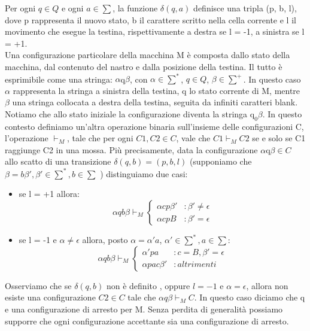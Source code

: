 Per ogni $q \in Q$ e ogni $a \in \sum$, la funzione $\delta(q, a)$ definisce una tripla (p, b, l), dove p rappresenta il nuovo stato, b il carattere scritto nella cella corrente e l il movimento che esegue la testina, rispettivamente a destra se l = -1, a sinistra se l = +1.\\
Una configurazione particolare della macchina M è composta dallo stato della macchina, dal contenuto del nastro e dalla posizione della testina. Il tutto è esprimibile come una stringa: $\alpha$q$\beta$, con $\alpha \in \sum^*$, $q \in Q$, $\beta \in \sum^+$. In questo caso $\alpha$ rappresenta la stringa a sinistra della testina, q lo stato corrente di M, mentre $\beta$ una stringa collocata a destra della testina, seguita da infiniti caratteri blank. Notiamo che allo stato iniziale la configurazione diventa la stringa $\mathrm{q}_{0} \beta$. In questo contesto definiamo un'altra operazione binaria sull'insieme delle configurazioni C, l'operazione $\vdash_{M}$, tale che per ogni $C1, C2 \in C$, vale che $C1 \vdash_{M} C2$ se e solo se C1 raggiunge C2 in una mossa. Più precisamente, data la configurazione $\alpha$q$\beta \in C$ allo scatto di una transizione $\delta(q, b) = (p, b, l)$ (supponiamo che $\beta = b\beta', \beta' \in \sum^*, b \in \sum$ ) distinguiamo due casi:\\
\begin{itemize}
\item{se l = +1 allora:}
\[\alpha qb \beta \vdash_{M} \left\{
  \begin{array}{lr}
    \alpha cp \beta' & : \beta' \neq \epsilon\\
    \alpha cpB & : \beta' = \epsilon
  \end{array}
\right.
\]
\item{se l = -1 e $\alpha \neq \epsilon$ allora, posto $\alpha = \alpha' a $, $\alpha' \in \sum^*, a \in \sum$:}
\[\alpha qb \beta \vdash_{M} \left\{
  \begin{array}{lr}
    \alpha' pa & : c = B, \beta' = \epsilon\\
    \alpha pac\beta' & : altrimenti
  \end{array}
\right.
\]
\end{itemize}
Osserviamo che se $\delta(q,b)$ non è definito , oppure $l = -1$ e $\alpha = \epsilon$, allora non esiste una configurazione $C2 \in C$ tale che $\alpha q \beta \vdash_{M} C$. In questo caso diciamo che q e una configurazione di arresto per M. Senza perdita di generalità possiamo supporre che ogni configurazione accettante sia una configurazione di arresto.\\
